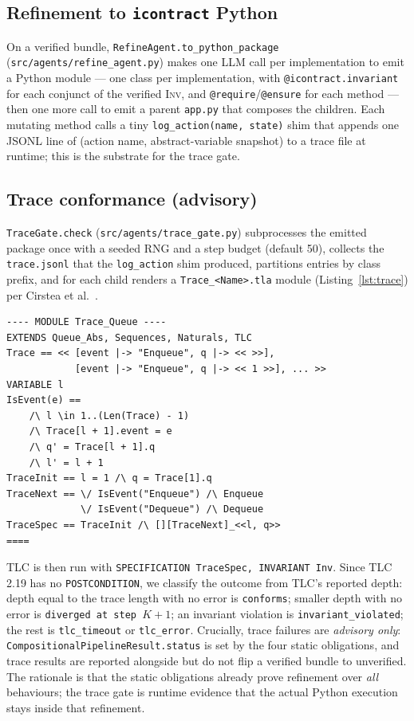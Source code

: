 \documentclass[11pt]{article}
\newcommand{\inv}{\textsc{Inv}}
\begin{document}
\subsection{Refinement to \texttt{icontract} Python}
On a verified bundle, \texttt{RefineAgent.to\_python\_package}
(\texttt{src/agents/refine\_agent.py}) makes one LLM call per implementation
to emit a Python module --- one class per implementation, with
\texttt{@icontract.invariant} for each conjunct of the verified
\inv{}, and \texttt{@require}/\texttt{@ensure} for each method --- then one
more call to emit a parent \texttt{app.py} that composes the children. Each
mutating method calls a tiny \texttt{log\_action(name, state)} shim that
appends one JSONL line of (action name, abstract-variable snapshot) to a
trace file at runtime; this is the substrate for the trace gate.

\subsection{Trace conformance (advisory)}
\texttt{TraceGate.check} (\texttt{src/agents/trace\_gate.py}) subprocesses
the emitted package once with a seeded RNG and a step budget (default 50),
collects the \texttt{trace.jsonl} that the \texttt{log\_action} shim
produced, partitions entries by class prefix, and for each child renders a
\texttt{Trace\_<Name>.tla} module (Listing~\ref{lst:trace}) per
Cirstea et al.~\cite{cirstea2024}.

\begin{lstlisting}[caption={Generated \texttt{Trace\_<Name>.tla}, replaying
one execution against the child's abstract spec.},label=lst:trace,float=t]
---- MODULE Trace_Queue ----
EXTENDS Queue_Abs, Sequences, Naturals, TLC
Trace == << [event |-> "Enqueue", q |-> << >>],
            [event |-> "Enqueue", q |-> << 1 >>], ... >>
VARIABLE l
IsEvent(e) ==
    /\ l \in 1..(Len(Trace) - 1)
    /\ Trace[l + 1].event = e
    /\ q' = Trace[l + 1].q
    /\ l' = l + 1
TraceInit == l = 1 /\ q = Trace[1].q
TraceNext == \/ IsEvent("Enqueue") /\ Enqueue
             \/ IsEvent("Dequeue") /\ Dequeue
TraceSpec == TraceInit /\ [][TraceNext]_<<l, q>>
====
\end{lstlisting}

TLC is then run with \texttt{SPECIFICATION TraceSpec, INVARIANT Inv}. Since
TLC 2.19 has no \texttt{POSTCONDITION}, we classify the outcome from
TLC's reported depth: depth equal to the trace length with no error is
\texttt{conforms}; smaller depth with no error is \texttt{diverged at step
$K+1$}; an invariant violation is \texttt{invariant\_violated}; the rest is
\texttt{tlc\_timeout} or \texttt{tlc\_error}. Crucially, trace failures are
\emph{advisory only}: \texttt{CompositionalPipelineResult.status} is set by
the four static obligations, and trace results are reported alongside but do
not flip a verified bundle to unverified. The rationale is that the static
obligations already prove refinement over \emph{all} behaviours; the trace
gate is runtime evidence that the actual Python execution stays inside that
refinement.
\end{document}
